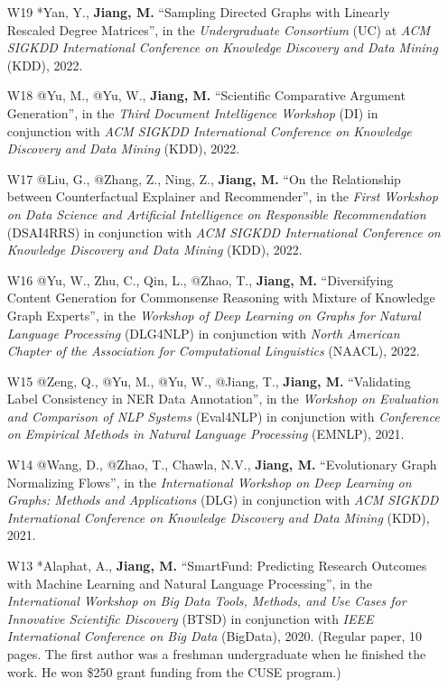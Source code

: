 \documentclass[10pt]{article}
\newenvironment{myindentpar}[1]%
{\begin{list}{}%
         {\setlength{\leftmargin}{#1}}%
         \item[]%
}
{\end{list}}
\newcounter{list}
\begin{document}
\begin{myindentpar}{0.00cm}
\begin{enumerate}[leftmargin=.5cm]
\item[W19] *Yan, Y., \textbf{Jiang, M.} ``Sampling Directed Graphs with Linearly Rescaled Degree Matrices'', in the \textit{Undergraduate Consortium} (UC) at \textit{ACM SIGKDD International Conference on Knowledge Discovery and Data Mining} (KDD), 2022.

\item[W18] @Yu, M., @Yu, W., \textbf{Jiang, M.} ``Scientific Comparative Argument Generation'', in the \textit{Third Document Intelligence Workshop} (DI) in conjunction with \textit{ACM SIGKDD International Conference on Knowledge Discovery and Data Mining} (KDD), 2022.

\item[W17] @Liu, G., @Zhang, Z., Ning, Z., \textbf{Jiang, M.} ``On the Relationship between Counterfactual Explainer and Recommender'', in the \textit{First Workshop on Data Science and Artificial Intelligence on Responsible Recommendation} (DSAI4RRS) in conjunction with \textit{ACM SIGKDD International Conference on Knowledge Discovery and Data Mining} (KDD), 2022.

\item[W16] @Yu, W., Zhu, C., Qin, L., @Zhao, T., \textbf{Jiang, M.} ``Diversifying Content Generation for Commonsense Reasoning with Mixture of Knowledge Graph Experts'', in the \textit{Workshop of Deep Learning on Graphs for Natural Language Processing} (DLG4NLP) in conjunction with \textit{North American Chapter of the Association for Computational Linguistics} (NAACL), 2022.
		
\item[W15] @Zeng, Q., @Yu, M., @Yu, W., @Jiang, T., \textbf{Jiang, M.} ``Validating Label Consistency in NER Data Annotation'', in the \textit{Workshop on Evaluation and Comparison of NLP Systems} (Eval4NLP) in conjunction with \textit{Conference on Empirical Methods in Natural Language Processing} (EMNLP), 2021.

\item[W14] @Wang, D., @Zhao, T., Chawla, N.V., \textbf{Jiang, M.} ``Evolutionary Graph Normalizing Flows'', in the \textit{International Workshop on Deep Learning on Graphs: Methods and Applications} (DLG) in conjunction with \textit{ACM SIGKDD International Conference on Knowledge Discovery and Data Mining} (KDD), 2021.

\item[W13] *Alaphat, A., \textbf{Jiang, M.} ``SmartFund: Predicting Research Outcomes with Machine Learning and Natural Language Processing'', in the \textit{International Workshop on Big Data Tools, Methods, and Use Cases for Innovative Scientific Discovery} (BTSD) in conjunction with \textit{IEEE International Conference on Big Data} (BigData), 2020. (Regular paper, 10 pages. The first author was a freshman undergraduate when he finished the work. He won \$250 grant funding from the CUSE program.)


\end{enumerate}
\end{myindentpar}
\end{document}
